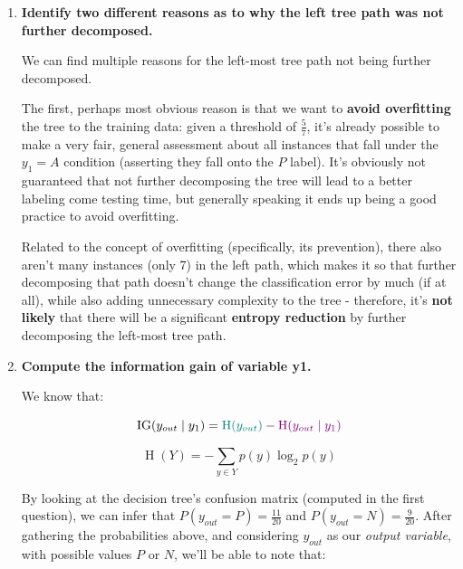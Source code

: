 \documentclass[12pt]{article}
\begin{document}
\begin{enumerate}[leftmargin=\labelsep]
  \item \textbf{Identify two different reasons as to why the left tree path was not further decomposed.}

        We can find multiple reasons for the left-most tree path not being further decomposed.

        The first, perhaps most obvious reason is that we want to \textbf{avoid overfitting} the
        tree to the training data: given a threshold of $\frac{5}{7}$, it's already possible
        to make a very fair, general assessment about all instances that fall under the $y_1 = A$
        condition (asserting they fall onto the $P$ label). It's obviously not guaranteed
        that not further decomposing the tree will lead to a better labeling come testing time,
        but generally speaking it ends up being a good practice to avoid overfitting.

        Related to the concept of overfitting (specifically, its prevention), there also aren't many
        instances (only 7) in the left path, which makes it so that further decomposing that path doesn't
        change the classification error by much (if at all), while also adding unnecessary complexity
        to the tree - therefore, it's \textbf{not likely} that there will be a significant
        \textbf{entropy reduction} by further decomposing the left-most tree path.

  \item \textbf{Compute the information gain of variable y1.}

        We know that:

        \begin{equation}
          \operatorname{IG}(y_{out} \mid y_1) = \textcolor{teal}{\operatorname{H}(y_{out})} - \textcolor{violet}{\operatorname{H}(y_{out} \mid y_1)}
        \end{equation}

        \begin{equation}
          \operatorname{H}(Y) = -\sum_{y \in Y} p(y) \log_2 p(y)
        \end{equation}

        By looking at the decision tree's confusion matrix (computed in the first question),
        we can infer that $P(y_{out} = P) = \frac{11}{20}$ and $P(y_{out} = N) = \frac{9}{20}$.
        After gathering the probabilities above, and considering $y_{out}$ as our \textit{output variable}, with possible values $P$ or $N$,
        we'll be able to note that:


\end{enumerate}
\end{document}
